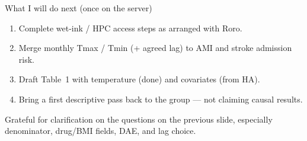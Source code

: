 \documentclass[aspectratio=169,11pt]{beamer}
\begin{document}
\begin{frame}{What I will do next (once on the server)}
  \begin{enumerate}
    \item Complete wet-ink / HPC access steps as arranged with Roro.
    \item Merge monthly Tmax / Tmin (+ agreed lag) to AMI and stroke admission risk.
    \item Draft Table~1 with temperature (done) and covariates (from HA).
    \item Bring a first descriptive pass back to the group --- not claiming causal results.
  \end{enumerate}

  \vspace{0.8em}
  Grateful for clarification on the questions on the previous slide, especially denominator, drug/BMI fields, DAE, and lag choice.
\end{frame}
\end{document}

